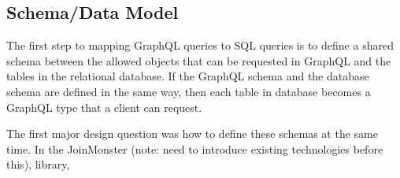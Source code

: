 \subsection{Schema/Data Model}

The first step to mapping GraphQL queries to SQL queries is to define a shared schema between the allowed objects that can be requested in GraphQL and the tables in the relational database.  If the GraphQL schema and the database schema are defined in the same way, then each table in database becomes a GraphQL type that a client can request.

The first major design question was how to define these schemas at the same time.  In the JoinMonster (note: need to introduce existing technologies before this), library, 